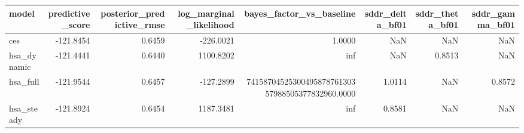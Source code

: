 \begin{tabular}{lrrrrrrr}
\toprule
model & predictive\_score & posterior\_predictive\_rmse & log\_marginal\_likelihood & bayes\_factor\_vs\_baseline & sddr\_delta\_bf01 & sddr\_theta\_bf01 & sddr\_gamma\_bf01 \\
\midrule
ces & -121.8454 & 0.6459 & -226.0021 & 1.0000 & NaN & NaN & NaN \\
hsa\_dynamic & -121.4441 & 0.6440 & 1100.8202 & inf & NaN & 0.8513 & NaN \\
hsa\_full & -121.9544 & 0.6457 & -127.2899 & 7415870452530049587876130357988505377832960.0000 & 1.0114 & NaN & 0.8572 \\
hsa\_steady & -121.8924 & 0.6454 & 1187.3481 & inf & 0.8581 & NaN & NaN \\
\bottomrule
\end{tabular}
